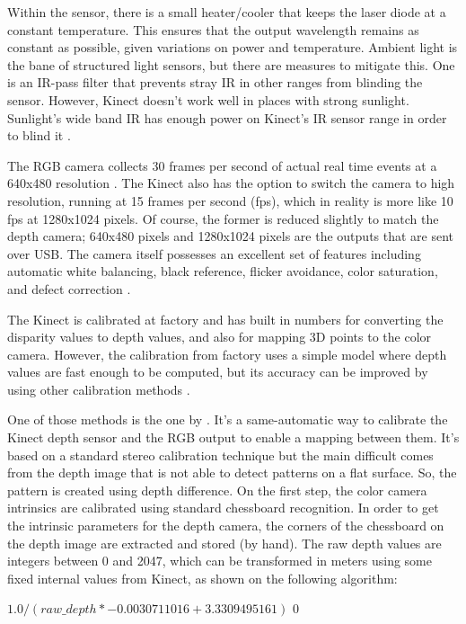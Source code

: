 \documentclass[msc, a4paper, classic, en]{ufbathesis}
\begin{document}
Within the sensor, there is a small heater/cooler that keeps the laser diode at a constant temperature. This ensures that the output wavelength remains as constant as possible, given variations on power and temperature. Ambient light is the bane of structured light sensors, but there are measures to mitigate this. One is an IR-pass filter that prevents stray IR in other ranges from blinding the sensor. However, Kinect doesn't work well in places with strong sunlight. Sunlight's wide band IR has enough power on Kinect's IR sensor range in order to blind it \cite{hackingkinect}.

The RGB camera collects 30 frames per second of actual real time events at a 640x480 resolution \cite{kinecthacks}. The Kinect also has the option to switch the camera to high resolution, running at 15 frames per second (fps), which in reality is more
like 10 fps at 1280x1024 pixels. Of course, the former is reduced slightly to match the depth camera;
640x480 pixels and 1280x1024 pixels are the outputs that are sent over USB. The camera itself possesses
an excellent set of features including automatic white balancing, black reference, flicker avoidance, color
saturation, and defect correction \cite{hackingkinect}.

The Kinect is calibrated at factory and has built in numbers for converting the disparity values to depth values, and also for mapping 3D points to the color camera. However, the calibration from factory uses a simple model where depth values are fast enough to be computed, but its accuracy can be improved by using other calibration methods \cite{magnus2013}.

One of those methods is the one by \cite{burruscal}. It's a same-automatic way to calibrate the Kinect depth sensor and the RGB output to enable a mapping between them. It's based on a standard stereo calibration technique but the main difficult comes from the depth image that is not able to detect patterns on a flat surface. So, the pattern is created using depth difference. On the first step, the color camera intrinsics are calibrated using standard chessboard recognition. In order to get the intrinsic parameters for the depth camera, the corners of the chessboard on the depth image are extracted and stored (by hand). The raw depth values are integers between 0 and 2047, which can be transformed in meters using some fixed internal values from Kinect, as shown on the following algorithm:

\begin{algorithmic}
\Return $1.0 / (raw\_depth * -0.0030711016 + 3.3309495161)$
\Else \Return $0$
\EndIf
\EndFunction
\end{algorithmic}
\end{document}
